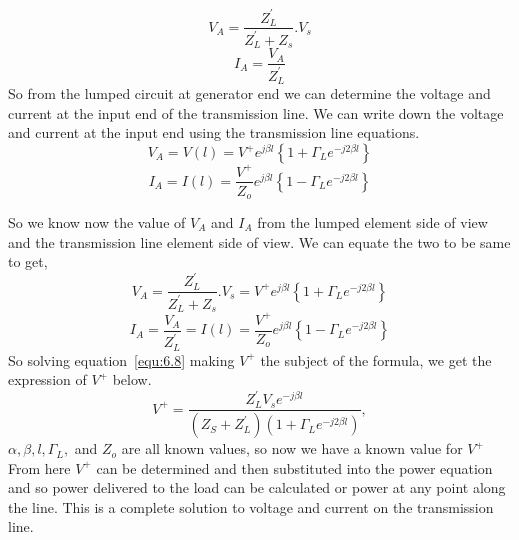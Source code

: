 \begin{equation}
V_A = \frac{Z^'_L}{Z^{'}_L + Z_s} . V_s
\end{equation}
\begin{equation}
I_A = \frac{V_A}{Z^{'}_L}
\end{equation} 
So from the lumped circuit at generator end we can determine the voltage and current at the input end of the transmission line. We can write down the voltage and current at the input end using the transmission line equations.
\begin{equation*} 
V_A= V(l) = V^+ e^{j\beta l} \left\lbrace 1 + \Gamma_L e^{-j2\beta l} \right\rbrace 
\end{equation*} 
\begin{equation*}
I_A = I(l) = \frac{V^+}{Z_o} e^{j\beta l} \left\lbrace 1 - \Gamma_L e^{-j2\beta l} \right\rbrace
\end{equation*}

So we know now the value of $V_A$ and $I_A$ from the lumped element side of view and the transmission line element side of view. We can equate the two to be same to get,
\begin{equation} 
V_A = \frac{Z^{'}_L}{Z^{'}_L + Z_s} . V_s = V^+ e^{j\beta l} \left\lbrace 1 + \Gamma_L e^{-j2\beta l} \right\rbrace 
\end{equation}
\begin{equation}
I_A = \frac{V_A}{Z^{'}_L} = I(l) = \frac{V^+}{Z_o} e^{j\beta l} \left\lbrace 1 - \Gamma_L e^{-j2\beta l} \right\rbrace
\label{equ:6.8}
\end{equation}
So solving equation~\ref{equ:6.8} making $V^{+}$ the subject of the formula, we get the expression of $V^+$ below. 
\begin{equation} 
V^+ = \frac{Z^{'}_L V_s e^{-j\beta l}}{(Z_S + Z^{'}_L)(1 + \Gamma_L e^{-j2\beta l })}, 
\end{equation}
$\alpha, \beta , l  , \Gamma_L,$ and $Z_o$ are all known values, so now we have a known value for $V^+$\\

From here $V^+$ can be determined and then substituted into the power equation and so power delivered to the load can be calculated or power at any point along the line. This is a complete solution to voltage and current on the transmission line.

